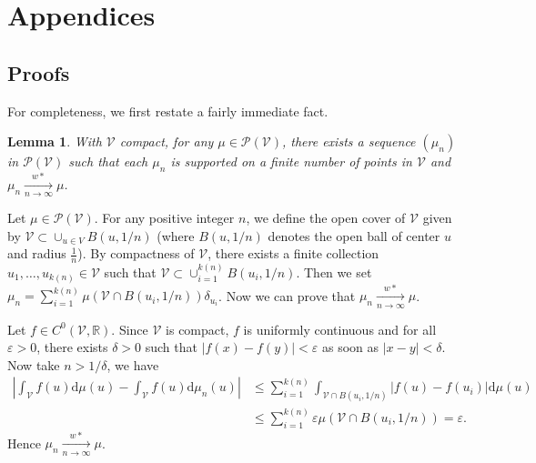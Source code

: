 \documentclass[twocolumn]{autart}
\newtheorem{lemma}[theorem]{Lemma}
\theoremstyle{definition}
\theoremstyle{remark}
\newcommand{\R}{\mathbb{R}}
\newcommand{\diff}{\mathrm{d}}
\newcommand{\V}{\mathcal{V}}
\renewcommand{\P}{\mathcal{P}}
\begin{document}
\appendix
\section{Appendices}
\subsection{Proofs}

For completeness, we first restate a fairly immediate fact. 
\begin{lemma}
With $\V$ compact, for any $\mu\in \P(\V)$, there exists a sequence $(\mu_n)$ in $\P(\V)$ such that each $\mu_n$  is supported on a finite number of points in $\V$ and $\mu_n\xrightarrow[n\to\infty]{w*}\mu$.
\end{lemma}
\begin{pf}
Let $\mu\in \P(\V)$.
For any positive integer $n$, we define the open cover of $\V$ given by $\V\subset \cup_{u\in V} B(u,1/n)$ (where $B(u,1/n)$ denotes the open ball of center $u$ and radius $\frac{1}{n}$). By compactness of $\V$, there exists a finite collection $u_1,\dots, u_{k(n)}\in \V$ such that $\V\subset \cup_{i=1}^{k(n)} B(u_i,1/n)$. Then we set $\mu_n=\sum_{i=1}^{k(n)} \mu(\V\cap B(u_i,1/n))\delta_{u_i}$. Now we can prove that $\mu_n\xrightarrow[n\to \infty]{w*}\mu$.

Let $f\in C^0(\V,\R)$. Since $\V$ is compact, $f$ is uniformly continuous and for all $\varepsilon>0$, there exists $\delta>0$ such that $|f(x)-f(y)|<\varepsilon$ as soon as $|x-y|<\delta$. Now take $n>1/\delta$, we have
$$
\begin{aligned}
\left|\int_\V f(u)\diff \mu(u)-\int_\V f(u)\diff\mu_n(u)\right|
&\leq
\sum_{i=1}^{k(n)}
\int_{\V\cap B(u_i,1/n)} |f(u)-f(u_i)|\diff\mu(u)
\\
&\leq 
\sum_{i=1}^{k(n)}\varepsilon\mu(\V\cap B(u_i,1/n))
=\varepsilon.
\end{aligned}
$$
Hence $\mu_n\xrightarrow[n\to \infty]{w*}\mu$.
\end{pf}
\end{document}
